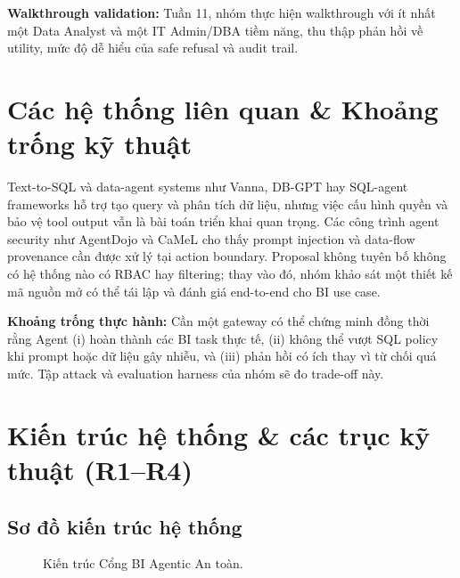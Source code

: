 \noindent\textbf{Walkthrough validation:} Tuần 11, nhóm thực hiện walkthrough với ít nhất một Data Analyst và một IT Admin/DBA tiềm năng, thu thập phản hồi về utility, mức độ dễ hiểu của safe refusal và audit trail.

\section{Các hệ thống liên quan \& Khoảng trống kỹ thuật}

Text-to-SQL và data-agent systems như Vanna, DB-GPT hay SQL-agent frameworks hỗ trợ tạo query và phân tích dữ liệu, nhưng việc cấu hình quyền và bảo vệ tool output vẫn là bài toán triển khai quan trọng. Các công trình agent security như AgentDojo và CaMeL cho thấy prompt injection và data-flow provenance cần được xử lý tại action boundary. Proposal không tuyên bố không có hệ thống nào có RBAC hay filtering; thay vào đó, nhóm khảo sát một thiết kế mã nguồn mở có thể tái lập và đánh giá end-to-end cho BI use case.

\noindent\textbf{Khoảng trống thực hành:} Cần một gateway có thể chứng minh đồng thời rằng Agent (i) hoàn thành các BI task thực tế, (ii) không thể vượt SQL policy khi prompt hoặc dữ liệu gây nhiễu, và (iii) phản hồi có ích thay vì từ chối quá mức. Tập attack và evaluation harness của nhóm sẽ đo trade-off này.

\section{Kiến trúc hệ thống \& các trục kỹ thuật (R1--R4)}

\subsection{Sơ đồ kiến trúc hệ thống}

\begin{figure}[h!]
    \centering
    \caption{Kiến trúc Cổng BI Agentic An toàn.}
    \label{fig:architecture}
\end{figure}

